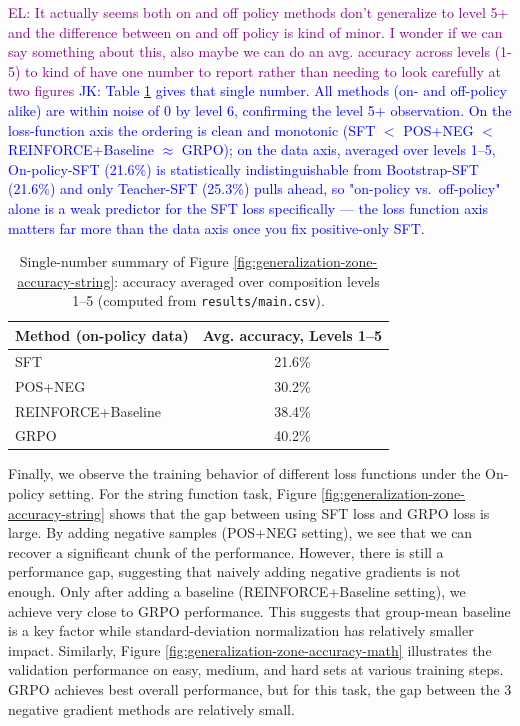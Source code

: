 \documentclass{article}
\newcommand{\el}[1]{\textcolor{purple}{EL: #1}}
\newcommand{\jk}[1]{\textcolor{blue}{JK: #1}}
\begin{document}
\el{It actually seems both on and off policy methods don't generalize to level 5+ and the difference between on and off policy is kind of minor. I wonder if we can say something about this, also maybe we can do an avg. accuracy across levels (1-5) to kind of have one number to report rather than needing to look carefully at two figures}
\jk{Table \ref{tab:avg-acc-levels} gives that single number. All methods (on- and off-policy alike) are within noise of 0 by level 6, confirming the level 5+ observation. On the loss-function axis the ordering is clean and monotonic (SFT $<$ POS+NEG $<$ REINFORCE+Baseline $\approx$ GRPO); on the data axis, averaged over levels 1--5, On-policy-SFT (21.6\%) is statistically indistinguishable from Bootstrap-SFT (21.6\%) and only Teacher-SFT (25.3\%) pulls ahead, so "on-policy vs.\ off-policy" alone is a weak predictor for the SFT loss specifically --- the loss function axis matters far more than the data axis once you fix positive-only SFT.}

\begin{table}[h!]
\centering
\begin{tabular}{lc}
\toprule
\textbf{Method (on-policy data)} & \textbf{Avg. accuracy, Levels 1--5} \\
\midrule
SFT & 21.6\% \\
POS+NEG & 30.2\% \\
REINFORCE+Baseline & 38.4\% \\
GRPO & 40.2\% \\
\bottomrule
\end{tabular}
\caption{Single-number summary of Figure \ref{fig:generalization-zone-accuracy-string}: accuracy averaged over composition levels 1--5 (computed from \texttt{results/main.csv}).}
\label{tab:avg-acc-levels}
\end{table}

Finally, we observe the training behavior of different loss functions under the On-policy setting. For the string function task, Figure \ref{fig:generalization-zone-accuracy-string} shows that the gap between using SFT loss and GRPO loss is large. By adding negative samples (POS+NEG setting), we see that we can recover a significant chunk of the performance. However, there is still a performance gap, suggesting that naively adding negative gradients is not enough. Only after adding a baseline (REINFORCE+Baseline setting), we achieve very close to GRPO performance. This suggests that group-mean baseline is a key factor while standard-deviation normalization has relatively smaller impact. Similarly, Figure \ref{fig:generalization-zone-accuracy-math} illustrates the validation performance on easy, medium, and hard sets at various training steps. GRPO achieves best overall performance, but for this task, the gap between the 3 negative gradient methods are relatively small.
\end{document}
